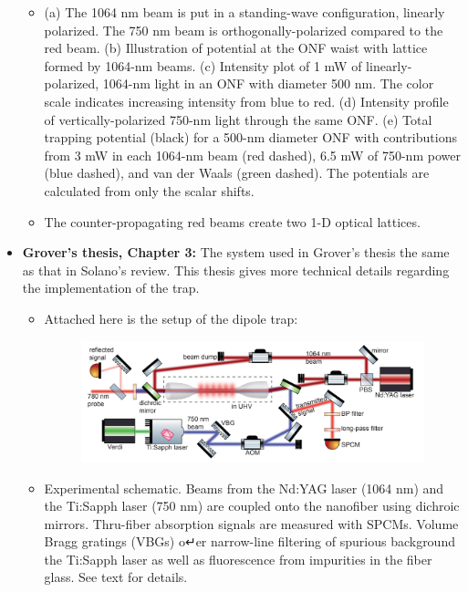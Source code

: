 \documentclass{book}
\theoremstyle{definition}
\begin{document}
\begin{itemize}
\begin{itemize}
	
		\item (a) The 1064 nm beam is put in a standing-wave configuration, linearly polarized. The 750 nm beam is orthogonally-polarized compared to the red beam. (b)  Illustration of potential at the
		ONF waist with lattice formed by 1064-nm beams. (c) Intensity plot of 1 mW of linearly-polarized, 1064-nm light in an ONF with diameter 500 nm. The color scale indicates increasing intensity from blue to red. (d) Intensity profile of vertically-polarized 750-nm light through the same ONF. (e) Total trapping potential (black) for a 500-nm diameter ONF
		with contributions from 3 mW in each 1064-nm beam (red dashed), 6.5
		mW of 750-nm power (blue dashed), and van der Waals (green dashed).
		The potentials are calculated from only the scalar shifts. 
		
		\item The counter-propagating red beams create two 1-D optical lattices. 
	\end{itemize} 



	\item \textbf{Grover's thesis, Chapter 3:} The system used in Grover's thesis the same as that in Solano's review. This thesis gives more technical details regarding the implementation of the trap. 
	
	\begin{itemize}
		\item Attached here is the setup of the dipole trap:
		\begin{figure}[!htb]
			\centering
			\includegraphics[scale=0.5]{dipole-trap-setup}
		\end{figure}
	
	
		\item  Experimental schematic. Beams from the Nd:YAG laser (1064 nm)
		and the Ti:Sapph laser (750 nm) are coupled onto the nanofiber using dichroic mirrors. Thru-fiber absorption signals are measured with SPCMs. Volume Bragg gratings (VBGs) o↵er narrow-line filtering of spurious background the Ti:Sapph laser as well as fluorescence from impurities in the fiber glass. See text for details.
	\end{itemize}
\end{itemize}
\end{document}

